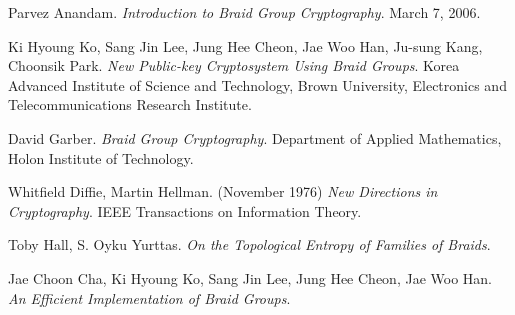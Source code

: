 \documentclass{article}
\theoremstyle{definition}
\begin{document}
\begin{thebibliography}{9}

Parvez Anandam. 
\textit{Introduction to Braid Group Cryptography}. 
March 7, 2006.
 
Ki Hyoung Ko, Sang Jin Lee, Jung Hee Cheon, Jae Woo Han, Ju-sung Kang, Choonsik Park.
\textit{New Public-key Cryptosystem Using Braid Groups}.
Korea Advanced Institute of Science and Technology, Brown University, Electronics and Telecommunications Research Institute. 

David Garber.
\textit{Braid Group Cryptography}.
Department of Applied Mathematics, Holon Institute of Technology. 
 
Whitfield Diffie, Martin Hellman. (November 1976)
\textit{New Directions in Cryptography}.
IEEE Transactions on Information Theory.


Toby Hall, S. Oyku Yurttas.
\textit{On the Topological Entropy of Families of Braids}.

Jae Choon Cha, Ki Hyoung Ko, Sang Jin Lee, Jung Hee Cheon, Jae Woo Han.
\textit{An Efficient Implementation of Braid Groups}.


\end{thebibliography}






	
\end{document}
